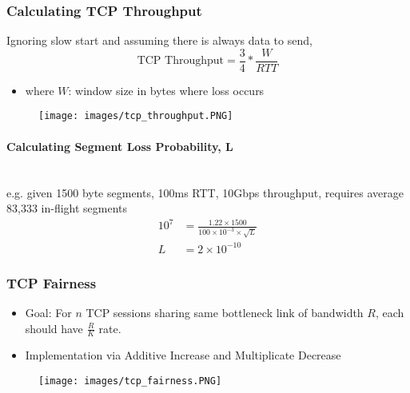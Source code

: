 \documentclass[a4paper]{article}
\begin{document}
\subsubsection{Calculating TCP Throughput}
Ignoring slow start and assuming there is always data to send,
$$\text{TCP Throughput} = \frac{3}{4}*\frac{W}{RTT}$$
\begin{itemize}
    \item where $W$: window size in bytes where loss occurs
\end{itemize}
\begin{figure}[H]
    \centering
    \texttt{[image: images/tcp\_throughput.PNG]}
\end{figure}

\paragraph{Calculating Segment Loss Probability, L}\mbox{}\\
e.g. given 1500 byte segments, 100ms RTT, 10Gbps throughput, requires average 83,333 in-flight segments
\begin{align*}
    10^7 &=  \frac{1.22\times1500}{100\times10^{-3}\times\sqrt{L}}\\
    L &= 2\times 10^{-10}
\end{align*}

\newpage
\subsubsection{TCP Fairness}
\begin{itemize}
    \item Goal: For $n$ TCP sessions sharing same bottleneck link of bandwidth $R$, each should have $\displaystyle\frac{R}{K}$ rate.
    \item Implementation via Additive Increase and Multiplicate Decrease
\end{itemize}
\begin{figure}[H]
    \centering
    \texttt{[image: images/tcp\_fairness.PNG]}
\end{figure}
\end{document}
